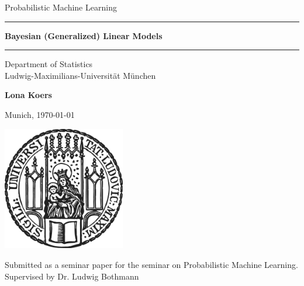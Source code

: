 \documentclass[12pt]{article}
\newcommand{\mytitle}{Bayesian (Generalized) Linear Models}
\newcommand{\myname}{Lona Koers}
\newcommand{\mysupervisor}{Dr. Ludwig Bothmann}
\begin{document}

\begin{titlepage}
\begin{center}

\LARGE
Probabilistic Machine Learning

\vspace{0.5cm}

\rule{\textwidth}{1.5pt}
\LARGE
\textbf{\mytitle}
\rule{\textwidth}{1.5pt}

\vspace{0.5cm}

\large
Department of Statistics \\
Ludwig-Maximilians-Universität München

\vfill

\Large
\textbf{\myname}

\vfill

\large
Munich, \today

\vfill

\includegraphics[width = 0.4\textwidth]{sigillum.png}

\vfill

\normalsize
Submitted as a seminar paper for the seminar on Probabilistic Machine Learning.
\\

Supervised by \mysupervisor

\end{center}
\end{titlepage}


\newpage
\end{document}
